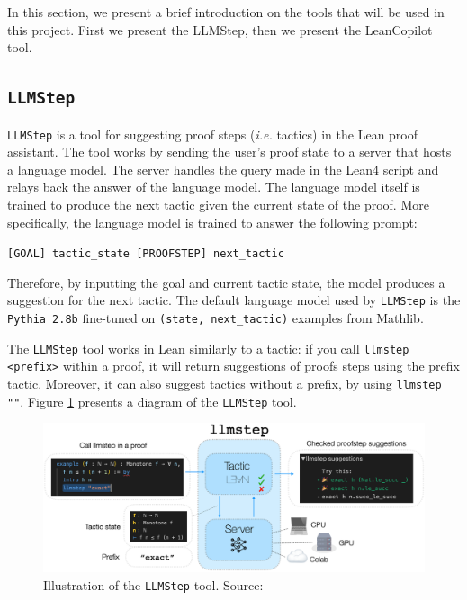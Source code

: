 \documentclass[12pt]{article}
\newcommand{\llmstep}{\texttt{LLMStep} }
\begin{document}
In this section, we present a brief introduction on the tools that will be used in this project. First we present the LLMStep, then we present the LeanCopilot tool. 

\subsection{\llmstep}
\llmstep \cite{llmstep} is a tool for suggesting proof steps (\emph{i.e.} tactics) in the Lean proof assistant. The tool works by sending the user's proof state to a server that hosts a language model. The server handles the query made in the Lean4 script and relays back the answer of the language model. The language model itself is trained to produce the next tactic given the current state of the proof. More specifically, the language model is trained to answer the following prompt:

\begin{center}
    \texttt{[GOAL] tactic\_state [PROOFSTEP] next\_tactic}
\end{center}

Therefore, by inputting the goal and current tactic state, the model produces a suggestion for the next tactic. The default language model used by \llmstep is the \texttt{Pythia 2.8b} fine-tuned on \texttt{(state, next\_tactic)} examples from Mathlib.

The \llmstep tool works in Lean similarly to a tactic: if you call \texttt{llmstep <prefix>} within a proof, it will return suggestions of proofs steps using the prefix tactic. Moreover, it can also suggest tactics without a prefix, by using \texttt{llmstep ""}. Figure \ref{fig:tools-llmstep} presents a diagram of the \llmstep tool.

\begin{figure}[h]
  \centering
  \includegraphics[width=\linewidth]{figures/llmstep.png}
  \caption{Illustration of the \llmstep tool. Source: \cite{llmstep}}
  \label{fig:tools-llmstep}
\end{figure}
\end{document}
